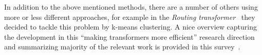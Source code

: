     In addition to the above mentioned methods, there are a number of others using more or less different approaches, for example in the \emph{Routing transformer}~\parencite{Roy_2021} they decided to tackle this problem by k-means clustering. A nice overview capturing the development in this \enquote{making transformers more efficient} research direction and summarizing majority of the relevant work is provided in this survey~\parencite{long_survey_2020}. %

    